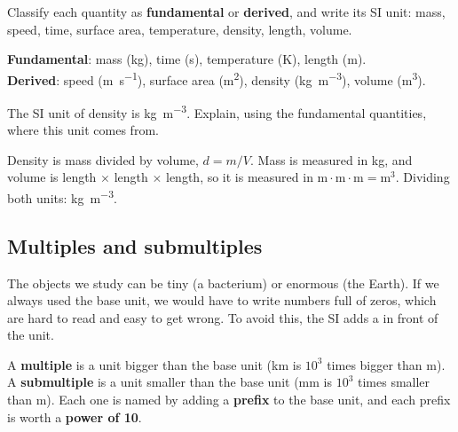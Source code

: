 \begin{exercise}
    Classify each quantity as \textbf{fundamental} or \textbf{derived}, and write its SI unit: mass, speed, time, surface area, temperature, density, length, volume.
    \begin{solu}
        \textbf{Fundamental}: mass (\unit{\kg}), time (\unit{\s}), temperature (\unit{\K}), length (\unit{\m}). \\
        \textbf{Derived}: speed (\unit{\m\per\s}), surface area (\unit{\square\m}), density (\unit{\kg\per\cubic\m}), volume (\unit{\cubic\m}).
    \end{solu}
\end{exercise}

\begin{exercise}
    The SI unit of density is \unit{\kg\per\cubic\m}. Explain, using the fundamental quantities, where this unit comes from.
    \begin{solu}
        Density is mass divided by volume, \(d = m/V\). Mass is measured in \unit{\kg}, and volume is length \(\times\) length \(\times\) length, so it is measured in \(\unit{\m}\cdot\unit{\m}\cdot\unit{\m} = \unit{\cubic\m}\). Dividing both units: \unit{\kg\per\cubic\m}.
    \end{solu}
\end{exercise}


\subsection{Multiples and submultiples}

The objects we study can be tiny (a bacterium) or enormous (the Earth). If we always used the base unit, we would have to write numbers full of zeros, which are hard to read and easy to get wrong. To avoid this, the SI adds a  in front of the unit.

\begin{definition}
    A \textbf{multiple} is a unit bigger than the base unit (\unit{\km} is \(10^{3}\) times bigger than \unit{\m}). A \textbf{submultiple} is a unit smaller than the base unit (\unit{\mm} is \(10^{3}\) times smaller than \unit{\m}). Each one is named by adding a \textbf{prefix} to the base unit, and each prefix is worth a \textbf{power of 10}.
\end{definition}

